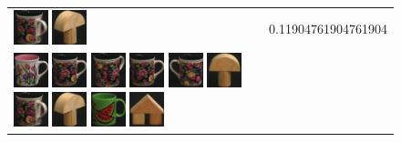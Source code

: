 \begin{figure}[tbp]
\begin{center}
\begin{tabular}{m{11cm} | m{3cm} |}
\includegraphics[width=1cm]{coil/beeld-64.eps}
\includegraphics[width=1cm]{coil/beeld-3.eps}
& {\scriptsize 0.11904761904761904}
\\
\includegraphics[width=1cm]{coil/beeld-6.eps}
\includegraphics[width=1cm]{coil/beeld-60.eps}
\includegraphics[width=1cm]{coil/beeld-63.eps}
\includegraphics[width=1cm]{coil/beeld-60.eps}
\includegraphics[width=1cm]{coil/beeld-61.eps}
\includegraphics[width=1cm]{coil/beeld-1.eps}
\includegraphics[width=1cm]{coil/beeld-64.eps}
\includegraphics[width=1cm]{coil/beeld-3.eps}
\includegraphics[width=1cm]{coil/beeld-30.eps}
\includegraphics[width=1cm]{coil/beeld-43.eps}

\end{tabular}
\end{center}
\end{figure}

